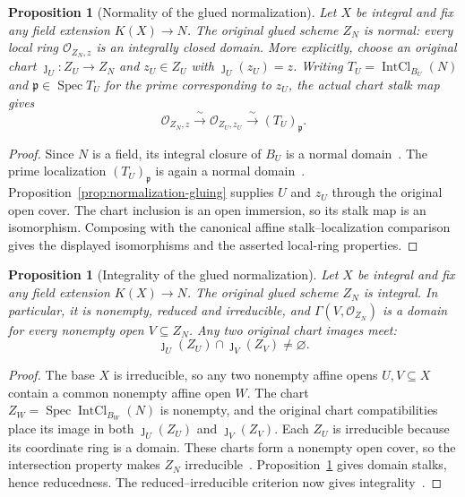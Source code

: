\documentclass[11pt]{article}
\newtheorem{proposition}[theorem]{Proposition}
\theoremstyle{definition}
\theoremstyle{remark}
\DeclareMathOperator{\Spec}{Spec}
\begin{document}
\begin{proposition}[Normality of the glued normalization]
\label{prop:normalization-global-normal}
Let \(X\) be integral and fix any field extension \(K(X)\to N\).
The original glued scheme \(Z_N\) is normal: every local ring
\(\mathcal O_{Z_N,z}\) is an integrally closed domain.
More explicitly, choose an original chart \(\jmath_U:Z_U\to Z_N\)
and \(z_U\in Z_U\) with \(\jmath_U(z_U)=z\). Writing
\(T_U=\operatorname{IntCl}_{B_U}(N)\) and
\(\mathfrak p\in\Spec T_U\) for the prime corresponding to \(z_U\),
the actual chart stalk map gives
\[
 \mathcal O_{Z_N,z}\xrightarrow{\ \sim\ }
 \mathcal O_{Z_U,z_U}\xrightarrow{\ \sim\ }(T_U)_{\mathfrak p}.
\]
\end{proposition}

\begin{proof}
Since \(N\) is a field, its integral closure of \(B_U\) is a normal
domain~\cite{StacksIntegralClosureNormal}. The prime localization
\((T_U)_{\mathfrak p}\) is again a normal
domain~\cite{StacksNormalLocalization}.
Proposition~\ref{prop:normalization-gluing} supplies \(U\) and \(z_U\)
through the original open cover. The chart inclusion is an open
immersion, so its stalk map is an isomorphism. Composing with the
canonical affine stalk--localization comparison gives the displayed
isomorphisms and the asserted local-ring properties.
\end{proof}

\begin{proposition}[Integrality of the glued normalization]
\label{prop:normalization-global-integral}
Let \(X\) be integral and fix any field extension \(K(X)\to N\).
The original glued scheme \(Z_N\) is integral. In particular, it is
nonempty, reduced and irreducible, and
\(\Gamma(V,\mathcal O_{Z_N})\) is a domain for every nonempty open
\(V\subseteq Z_N\). Any two original chart images meet:
\[
 \jmath_U(Z_U)\cap\jmath_V(Z_V)\ne\varnothing.
\]
\end{proposition}

\begin{proof}
The base \(X\) is irreducible, so any two nonempty affine opens
\(U,V\subseteq X\) contain a common nonempty affine open \(W\).
The chart \(Z_W=\Spec\operatorname{IntCl}_{B_W}(N)\) is nonempty,
and the original chart compatibilities place its image in both
\(\jmath_U(Z_U)\) and \(\jmath_V(Z_V)\).
Each \(Z_U\) is irreducible because its coordinate ring is a domain.
These charts form a nonempty open cover, so the intersection property
makes \(Z_N\) irreducible~\cite{StacksIrreducibleAffineCover}.
Proposition~\ref{prop:normalization-global-normal} gives domain stalks,
hence reducedness. The reduced--irreducible criterion now gives
integrality~\cite{StacksIntegralReducedIrreducible}.
\end{proof}
\end{document}
